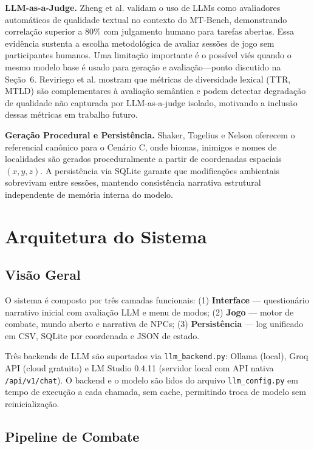 \documentclass[12pt]{article}
\begin{document}
\textbf{LLM-as-a-Judge.}
Zheng et al. \cite{zheng:2023} validam o uso de LLMs como avaliadores automáticos de qualidade textual no contexto do MT-Bench, demonstrando correlação superior a 80\% com julgamento humano para tarefas abertas. Essa evidência sustenta a escolha metodológica de avaliar sessões de jogo sem participantes humanos. Uma limitação importante é o possível viés quando o mesmo modelo base é usado para geração e avaliação---ponto discutido na Seção~6. Reviriego et al. \cite{reviriego:2024} mostram que métricas de diversidade lexical (TTR, MTLD) são complementares à avaliação semântica e podem detectar degradação de qualidade não capturada por LLM-as-a-judge isolado, motivando a inclusão dessas métricas em trabalho futuro.

\textbf{Geração Procedural e Persistência.}
Shaker, Togelius e Nelson \cite{shaker:2016} oferecem o referencial canônico para o Cenário C, onde biomas, inimigos e nomes de localidades são gerados proceduralmente a partir de coordenadas espaciais $(x,y,z)$. A persistência via SQLite garante que modificações ambientais sobrevivam entre sessões, mantendo consistência narrativa estrutural independente de memória interna do modelo.

\section{Arquitetura do Sistema}

\subsection{Visão Geral}

O sistema é composto por três camadas funcionais: (1) \textbf{Interface} --- questionário narrativo inicial com avaliação LLM e menu de modos; (2) \textbf{Jogo} --- motor de combate, mundo aberto e narrativa de NPCs; (3) \textbf{Persistência} --- log unificado em CSV, SQLite por coordenada e JSON de estado.

Três backends de LLM são suportados via \texttt{llm\_backend.py}: Ollama (local), Groq API (cloud gratuito) e LM Studio 0.4.11 (servidor local com API nativa \texttt{/api/v1/chat}). O backend e o modelo são lidos do arquivo \texttt{llm\_config.py} em tempo de execução a cada chamada, sem cache, permitindo troca de modelo sem reinicialização.

\subsection{Pipeline de Combate}
\end{document}
